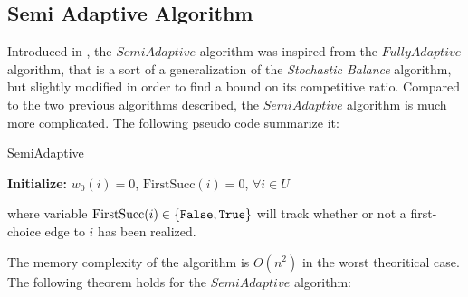 \documentclass[12pt, twocolumn]{article}
\begin{document}
\subsection{Semi Adaptive Algorithm}

\par
\hspace{\parindent}Introduced in \cite{mehta2015}, the $SemiAdaptive$ algorithm was inspired from the $FullyAdaptive$ algorithm, that is a sort of a generalization of the \textit{Stochastic Balance} algorithm, but slightly modified in order to find a bound on its competitive ratio. Compared to the two previous algorithms described, the $SemiAdaptive$ algorithm is much more complicated. The following pseudo code summarize it:


\begin{algorithm}[H]
\caption{SemiAdaptive}
\label{alg:SemiAdaptive}
\textbf{Initialize:} \( w_0(i) = 0 \), \( \text{FirstSucc}(i) = 0 \), \( \forall i \in U\)\;
\end{algorithm}
where variable $\text{FirstSucc}(i) \in \{\verb|False|, \verb|True|\}$ will track whether or not a first-choice edge to $i$ has been
realized. 

\par
\hspace{\parindent}The memory complexity of the algorithm is $O(n^2)$ in the worst theoritical case. The following theorem holds for the $SemiAdaptive$ algorithm:
\end{document}
